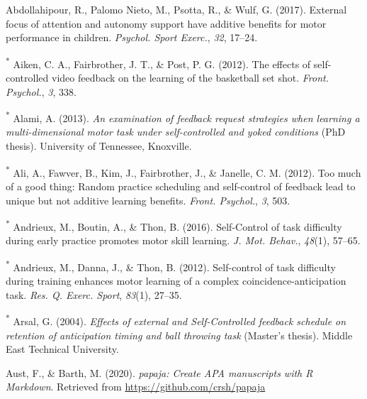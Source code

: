 \documentclass[
  english,
  man, donotrepeattitle,floatsintext]{apa7}
\newlength{\cslhangindent}
\newlength{\cslentryspacingunit} %
\newenvironment{CSLReferences}[2] %
 {%
  \setlength{\parindent}{0pt}
  \ifodd #1
  \let\oldpar\par
  \def\par{\hangindent=\cslhangindent\oldpar}
  \fi
  \setlength{\parskip}{#2\cslentryspacingunit}
 }%
 {}
\begin{document}
\hypertarget{refs}{}
\begin{CSLReferences}{1}{0}
\leavevmode{}%
Abdollahipour, R., Palomo Nieto, M., Psotta, R., \& Wulf, G. (2017). External focus of attention and autonomy support have additive benefits for motor performance in children. \emph{Psychol. Sport Exerc.}, \emph{32}, 17--24.

\leavevmode{}%
\textsuperscript{*} Aiken, C. A., Fairbrother, J. T., \& Post, P. G. (2012). The effects of self-controlled video feedback on the learning of the basketball set shot. \emph{Front. Psychol.}, \emph{3}, 338.

\leavevmode{}%
\textsuperscript{*} Alami, A. (2013). \emph{An examination of feedback request strategies when learning a multi-dimensional motor task under self-controlled and yoked conditions} (PhD thesis). University of Tennessee, Knoxville.

\leavevmode{}%
\textsuperscript{*} Ali, A., Fawver, B., Kim, J., Fairbrother, J., \& Janelle, C. M. (2012). Too much of a good thing: Random practice scheduling and self-control of feedback lead to unique but not additive learning benefits. \emph{Front. Psychol.}, \emph{3}, 503.

\leavevmode{}%
\textsuperscript{*} Andrieux, M., Boutin, A., \& Thon, B. (2016). {Self-Control} of task difficulty during early practice promotes motor skill learning. \emph{J. Mot. Behav.}, \emph{48}(1), 57--65.

\leavevmode{}%
\textsuperscript{*} Andrieux, M., Danna, J., \& Thon, B. (2012). Self-control of task difficulty during training enhances motor learning of a complex coincidence-anticipation task. \emph{Res. Q. Exerc. Sport}, \emph{83}(1), 27--35.

\leavevmode{}%
\textsuperscript{*} Arsal, G. (2004). \emph{Effects of external and {Self-Controlled} feedback schedule on retention of anticipation timing and ball throwing task} (Master's thesis). Middle East Technical University.

\leavevmode{}%
Aust, F., \& Barth, M. (2020). \emph{{papaja}: {Create} {APA} manuscripts with {R Markdown}}. Retrieved from \url{https://github.com/crsh/papaja}


\end{CSLReferences}
\end{document}
